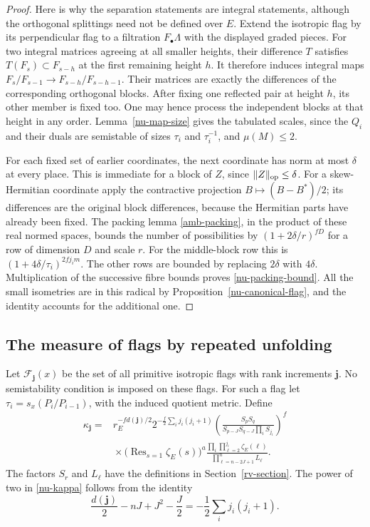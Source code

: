 \begin{proof}
Here is why the separation statements are
integral statements, although the orthogonal
splittings need not be defined over $E$.
Extend the isotropic flag by its perpendicular
flag to a filtration $F_\bullet\Lambda$ with the
displayed graded pieces.  For two integral
matrices agreeing at all smaller heights,
their difference $T$ satisfies
$T(F_s)\subset F_{s-h}$ at the first remaining
height $h$.  It therefore induces integral maps
$F_s/F_{s-1}\to F_{s-h}/F_{s-h-1}$.
Their matrices are exactly the differences of
the corresponding orthogonal blocks.
After fixing one reflected pair at height $h$,
its other member is fixed too.  One may hence
process the independent blocks at that height
in any order.  Lemma~\ref{nu-map-size} gives
the tabulated scales, since the $Q_i$ and their
duals are semistable of sizes $\tau_i$ and
$\tau_i^{-1}$, and $\mu(M)\le2$.

For each fixed set of earlier coordinates,
the next coordinate has norm at most $\delta$
at every place.  This is immediate for a block
of $Z$, since $\|Z\|_{\rm op}\le\delta$.
For a skew-Hermitian coordinate apply the
contractive projection $B\mapsto(B-B^*)/2$;
its differences are the original block
differences, because the Hermitian parts
have already been fixed.
The packing lemma \ref{amb-packing}, in the
product of these real normed spaces, bounds
the number of possibilities by
$(1+2\delta/r)^{fD}$ for a row of dimension
$D$ and scale $r$.
For the middle-block row this is
$(1+4\delta/\tau_i)^{2fj_im}$.
The other rows are bounded by replacing
$2\delta$ with $4\delta$.
Multiplication of the successive fibre
bounds proves \eqref{nu-packing-bound}.
All the small isometries are in this radical
by Proposition~\ref{nu-canonical-flag}, and
the identity accounts for the additional one.
\end{proof}

\subsection{The measure of flags by repeated unfolding}

Let $\mathcal F_{\mathbf j}(x)$ be the set of all
primitive isotropic flags with rank increments
$\mathbf j$.  No semistability condition is
imposed on these flags.  For such a flag let
$\tau_i=s_x(P_i/P_{i-1})$, with the induced
quotient metric.
Define
\begin{equation}\label{nu-kappa}
 \begin{split}
 \kappa_{\mathbf j}
  ={}&r_E^{-f d(\mathbf j)/2}
       2^{-\frac f2\sum_i j_i(j_i+1)}
       \left(\frac{S_pS_q}
        {S_{p-J}S_{q-J}\prod_i S_{j_i}}\right)^f\\
     &{}\times
       \bigl(\operatorname{Res}_{s=1}\zeta_E(s)\bigr)^a
       \frac{\displaystyle\prod_i\prod_{\ell=2}^{j_i}
                         \zeta_E(\ell)}
            {\displaystyle\prod_{\ell=n-2J+1}^{n}L_\ell}.
 \end{split}
\end{equation}
The factors $S_r$ and $L_\ell$ have the definitions
in Section~\ref{rv-section}.  The power of two in
\eqref{nu-kappa} follows from the identity
\[
 \frac{d(\mathbf j)}2-nJ+J^2-\frac J2
                      =-\frac12\sum_i j_i(j_i+1).
\]

